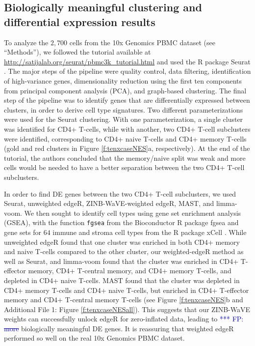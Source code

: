 \documentclass{bmcart}
\newcommand{\RPack}[1]{\textsf{#1}}
\newcommand{\RObj}[1]{\texttt{#1}}
\newcommand{\fanny}[1]{\textcolor{blue}{*** FP: #1}}
\begin{document}
\subsection*{Biologically meaningful clustering and differential expression results}
To analyze the $2,700$ cells from the 10x Genomics PBMC dataset (see ``Methods''), we followed the tutorial available at \url{http://satijalab.org/seurat/pbmc3k_tutorial.html} and used the R package \RPack{Seurat} \citep{Butler2017}. The major steps of the pipeline were quality control, data filtering, identification of high-variance genes, dimensionality reduction using the first ten components from principal component analysis (PCA), and graph-based clustering. The final step of the pipeline was to identify genes that are differentially expressed between clusters, in order to derive cell type signatures. Two different parameterizations were used for the \RPack{Seurat} clustering. With one parameterization, a single cluster was identified for CD4+ T-cells, while with another, two CD4+ T-cell subclusters were identified, corresponding to CD4+ naive T-cells and CD4+ memory T-cells (gold and red clusters in Figure \ref{f:tenxcaseNES}a, respectively). At the end of the tutorial, the authors concluded that the memory/naive split was weak and more cells would be needed to have a better separation between the two CD4+ T-cell subclusters.

In order to find DE genes between the two CD4+ T-cell subclusters, we used \RPack{Seurat}, unweighted \RPack{edgeR}, ZINB-WaVE-weighted \RPack{edgeR}, \RPack{MAST}, and limma-voom. We then sought to identify cell types using gene set enrichment analysis (GSEA), with the function \RObj{fgsea} from the Bioconductor R package \RPack{fgsea} \citep{Sergushichev2016} and gene sets for $64$ immune and stroma cell types from the R package \RPack{xCell} \citep{Aran2017}. 
While unweighted \RPack{edgeR} found that one cluster was enriched in both CD4+ memory and naive T-cells compared to the other cluster, our weighted-edgeR method as well as \RPack{Seurat}, and limma-voom found that the cluster was enriched in CD4+ T-effector memory, CD4+ T-central memory, and CD4+ memory T-cells, and depleted in CD4+ naive T-cells. \RPack{MAST} found that the cluster was depleted in CD4+ memory T-cells and CD4+ naive T-cells, but enriched in CD4+ T-effector memory and CD4+ T-central memory T-cells (see Figure \ref{f:tenxcaseNES}b and Additional File 1: Figure \ref{f:tenxcaseNESall}). This suggests that our ZINB-WaVE weights can successfully unlock \RPack{edgeR} for zero-inflated data, leading to \fanny{\sout{more}} biologically meaningful DE genes. It is reassuring that weighted \RPack{edgeR} performed so well on the real 10x Genomics PBMC dataset.
\end{document}
